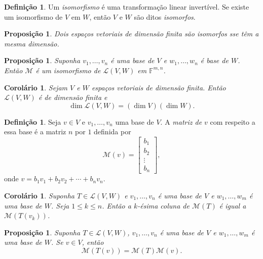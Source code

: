 \documentclass[12pt]{article}
\theoremstyle{plain}
\newtheorem{prop}[thm]{Proposição}
\newtheorem{cor}[thm]{Corolário}
\theoremstyle{definition}
\newtheorem{defn}[thm]{Definição}
\theoremstyle{remark}
\begin{document}
\begin{defn}
    Um \emph{isomorfismo} é uma transformação linear invertível. Se existe um isomorfismo de \(V\) em \(W\), então \(V\) e \(W\) são ditos \emph{isomorfos}.
\end{defn}

\begin{prop}
    Dois espaços vetoriais de dimensão finita são isomorfos sse têm a mesma dimensão.
\end{prop}

\begin{prop}
    Suponha \(v_1, \ldots, v_n\) é uma base de \(V\) e \(w_1, \ldots, w_n\) é base de \(W\). Então \(\mathcal{M}\) é um isomorfismo de \(\mathcal{L}(V, W)\) em \(\mathbb{F}^{m,n}\).
\end{prop}

\begin{cor}
    Sejam \(V\) e \(W\) espaços vetoriais de dimensão finita. Então \(\mathcal{L}(V, W)\) é de dimensão finita e
    \[
        \dim \mathcal{L}(V, W) = (\dim V)(\dim W).
    \]
\end{cor}

\begin{defn}
    Seja \(v \in V\) e \(v_1,\ldots,v_n\) uma base de \(V\). A \emph{matriz de \(v\)} com respeito a essa base é a matriz \(n\) por \(1\) definida por
    \[
        \mathcal{M}(v) = \begin{bmatrix}
            b_1 \\
            b_2 \\
            \vdots \\
            b_n
        \end{bmatrix},
    \]
    \noindent onde \(v = b_1 v_1 + b_2 v_2 + \cdots + b_n v_n\).
\end{defn}

\begin{cor}
    Suponha \(T \in \mathcal{L}(V, W)\) e \(v_1,\ldots,v_n\) é uma base de \(V\) e \(w_1,\ldots,w_m\) é uma base de \(W\). Seja \(1 \leq k \leq n\). Então a \(k\)-ésima coluna de \(\mathcal{M}(T)\) é igual a \(\mathcal{M}(T(v_k))\).
\end{cor}

\begin{prop}
    Suponha \(T \in \mathcal{L}(V, W)\), \(v_1,\ldots,v_n\) é uma base de \(V\) e \(w_1,\ldots,w_m\) é uma base de \(W\). Se \(v \in V\), então
    \[
        \mathcal{M}(T(v)) = \mathcal{M}(T) \mathcal{M}(v).
    \]
\end{prop}
\end{document}

